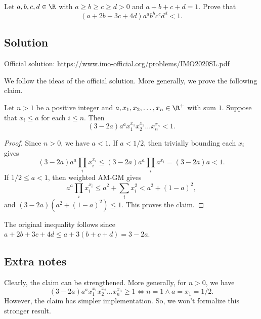 Let $a, b, c, d \in \R$ with $a \geq b \geq c \geq d > 0$ and $a + b + c + d = 1$.
Prove that \[ (a + 2b + 3c + 4d) a^a b^b c^c d^d < 1. \]



\subsection*{Solution}

Official solution: \url{https://www.imo-official.org/problems/IMO2020SL.pdf}

We follow the ideas of the official solution.
More generally, we prove the following claim.

\begin{claim}
Let $n > 1$ be a positive integer and $a, x_1, x_2, \ldots, x_n \in \R^+$ with sum $1$.
Suppose that $x_i \leq a$ for each $i \leq n$.
Then \[ (3 - 2a) a^a x_1^{x_1} x_2^{x_2} \ldots x_n^{x_n} < 1. \]
\end{claim}
\begin{proof}
Since $n > 0$, we have $a < 1$.
If $a < 1/2$, then trivially bounding each $x_i$ gives
\[ (3 - 2a) a^a \prod_i x_i^{x_i} \leq (3 - 2a) a^a \prod_i a^{x_i} = (3 - 2a) a < 1. \]
If $1/2 \leq a < 1$, then weighted AM-GM gives
\[ a^a \prod_i x_i^{x_i} \leq a^2 + \sum_i x_i^2 < a^2 + (1 - a)^2, \]
    and $(3 - 2a)(a^2 + (1 - a)^2) \leq 1$.
This proves the claim.  
\end{proof}

The original inequality follows since $a + 2b + 3c + 4d \leq a + 3(b + c + d) = 3 - 2a$.



\subsection*{Extra notes}

Clearly, the claim can be strengthened.
More generally, for $n > 0$, we have
\[ (3 - 2a) a^a x_1^{x_1} x_2^{x_2} \ldots x_n^{x_n} \geq 1 \iff n = 1 \wedge a = x_1 = 1/2. \]
However, the claim has simpler implementation.
So, we won't formalize this stronger result.
